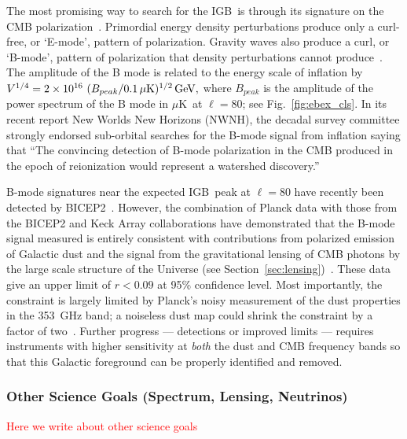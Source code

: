 \documentclass[12pt]{article}
\def\igb{IGB}
\def\microk{$\mu{\mbox{K}}$}
\newcommand{\comred}[1]{\textcolor{red}{#1}}
\begin{document}
The most promising way to search for the \igb\ is through its signature on the CMB polarization~\cite{kamionkowski97b,seljak97}.  
Primordial energy density perturbations produce only a curl-free, or `E-mode', pattern of polarization.
Gravity waves also produce a curl, or `B-mode', pattern of polarization that density perturbations cannot
produce~\cite{kamionkowski97a,zaldarriaga97}.  The amplitude of the B mode is related to the energy scale
of inflation by $V^{1/4}=2\times10^{16} \ ( B_{peak} / 0.1\,\mu{\rm
K})^{1/2} \,{\rm GeV},$ where $B_{peak}$ is the amplitude of the power spectrum of the B mode in \microk\ at $\ell=80$;
see Fig.~\ref{fig:ebex_cls}. In its recent report New Worlds New Horizons (NWNH), the decadal survey 
committee strongly endorsed sub-orbital searches for the B-mode signal from 
inflation saying that ``The convincing detection of B-mode polarization in the CMB produced in the 
epoch of reionization would represent a watershed discovery.''~\cite{blandford2010}

B-mode signatures near the expected \igb\ peak at $\ell=80$ have recently been detected by BICEP2~\cite{bicep2Bmode}. 
However, the combination of Planck data with those from the BICEP2 and Keck Array collaborations have demonstrated 
that the B-mode signal measured is entirely consistent with contributions from polarized emission of Galactic dust and the 
signal from the gravitational lensing of CMB photons by the large scale structure of the Universe (see 
Section~\ref{sec:lensing})~\cite{bkp2015,planck2014-XXX,2016PhRvL.116c1302B}. 
These data give an upper limit of $r<0.09$ at 95\% confidence level.
Most importantly, the constraint is largely limited by Planck's noisy measurement of the dust properties in the 353~GHz band; 
a noiseless dust map could shrink the constraint by a factor of two~\cite{bkp2015}. 
Further progress --- detections or improved limits --- requires instruments 
with higher sensitivity at {\it both} the dust and CMB frequency bands so that this Galactic foreground can be properly identified 
and removed. 

\vspace{-0.22in}

\subsubsection{Other Science Goals (Spectrum, Lensing, Neutrinos)}

\vspace{-0.05in}

\comred{Here we write about other science goals}
\end{document}
